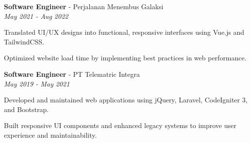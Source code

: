 \vspace{1em}

\textbf{Software Engineer} - Perjalanan Menembus Galaksi \\
\textit{May 2021 - Aug 2022}
\begin{highlights}
    \item Translated UI/UX designs into functional, responsive interfaces using Vue.js and TailwindCSS.
    \item Optimized website load time by implementing best practices in web performance.
\end{highlights}

\vspace{1em}

\textbf{Software Engineer} - PT Telematric Integra \\
\textit{May 2019 - May 2021}
\begin{highlights}
    \item Developed and maintained web applications using jQuery, Laravel, CodeIgniter 3, and Bootstrap.
    \item Built responsive UI components and enhanced legacy systems to improve user experience and maintainability.
\end{highlights}
